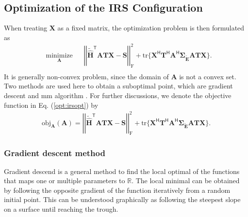 \documentclass[12pt,draftclsnofoot,onecolumn,journal]{IEEEtran}
\begin{document}
\subsection{Optimization of the IRS Configuration}
When treating $\mathbf X$ as a fixed matrix, the optimization problem is then formulated as
\begin{equation}
\begin{aligned}
& \underset{\mathbf A}{\text{minimize}}
& &\left|\left|\tilde{\hat{\mathbf H}}^{\mathsf T}\mathbf{ATX}-\mathbf{S}\right|\right|_{\mathrm{F}}^2+\mathrm{tr}\{\mathbf X^{\mathsf H}\mathbf T^{\mathsf H}\mathbf A^{\mathsf H}
\pmb{\Sigma_{\tilde{\mathbf E}}}\mathbf{ATX}\}.\\
\label{opt:irsopt}
\end{aligned}
\end{equation}
It is generally non-convex problem, since the domain of $\mathbf A$ is not a convex set. Two methods are used here to obtain a suboptimal point, which are gradient descent and \ac{mm} algorithm \cite{sankuru2020designing}. For further discussions, we denote the objective function in Eq. (\ref{opt:irsopt}) by
\begin{equation}
\begin{split}
\mathrm{obj}_{\mathbf A}(\mathbf A)=\left|\left|\tilde{\hat{\mathbf H}}^{\mathsf T}\mathbf{ATX}-\mathbf{S}\right|\right|_{\mathrm{F}}^2+\mathrm{tr}\{\mathbf X^{\mathsf H}\mathbf T^{\mathsf H}\mathbf A^{\mathsf H}
\pmb{\Sigma_{\tilde{\mathbf E}}}\mathbf{ATX}\}.
\label{eq:objectivefunctionofirs}
\end{split}
\end{equation}

\subsubsection{Gradient descent method}
Gradient descend is a general method to find the local optimal of the functions that maps one or multiple parameters to $\mathbb R$. The local minimal can be obtained by following the opposite gradient of the function iteratively from a random initial point. This can be understood graphically as following the steepest slope on a surface until reaching the trough.
\end{document}

